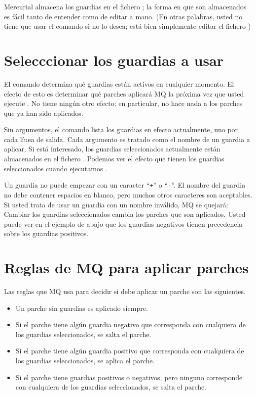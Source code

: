 Mercurial almacena los guardias en el fichero ; la
forma en que son almacenados es fácil tanto de entender como de editar
a mano. (En otras palabras, usted no tiene que usar el comando
 si no lo desea; está bien simplemente editar el
fichero )

\section{Selecccionar los guardias a usar}

El comando  determina qué guardias están activos
en cualquier momento. El efecto de esto es determinar qué parches
aplicará MQ la próxima vez que usted ejecute .  No
tiene ningún otro efecto; en particular, no hace nada a los parches
que ya han sido aplicados.

Sin argumentos, el comando  lista los guardias en
efecto actualmente, uno por cada línea de salida. Cada argumento es
tratado como el nombre de un guardia a aplicar.
Si está interesado, los guardias seleccionados actualmente están
almacenados en el fichero .
Podemos ver el efecto que tienen los guardias seleccionados cuando
ejecutamos .

Un guardia no puede empezar con un  caracter ``\texttt{+}'' o
``\texttt{-}''. El nombre del guardia no debe contener espacios en
blanco, pero muchos otros caracteres son aceptables. Si usted trata de
usar un guardia con un nombre inválido, MQ se quejará:
Cambiar los guardias seleccionados cambia los parches que son
aplicados.
Usted puede ver en el ejemplo de abajo que los guardias negativos
tienen precedencia sobre los guardias positivos.

\section{Reglas de MQ para aplicar parches}

Las reglas que MQ usa para decidir si debe aplicar un parche son las
siguientes.
\begin{itemize}
\item Un parche sin guardias es aplicado siempre.
\item Si el parche tiene algún guardia negativo que corresponda con
  cualquiera de los guardias seleccionados, se salta el parche.
\item Si el parche tiene algún guardia positivo que corresponda con
  cualquiera de los guardias seleccionados, se aplica el parche.
\item Si el parche tiene guardias positivos o negativos, pero ninguno
  corresponde con cualquiera de los guardias seleccionados, se salta
  el parche.
\end{itemize}

